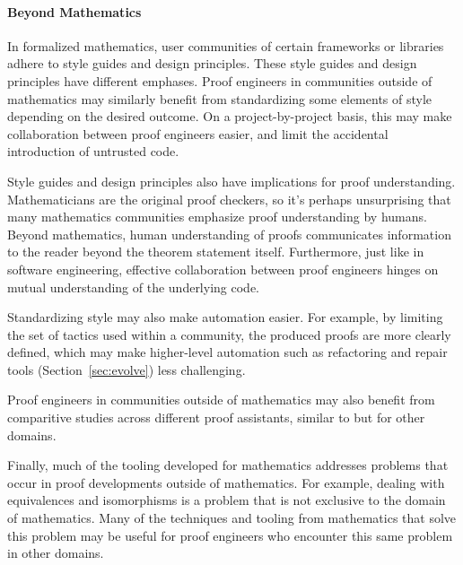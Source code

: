 \paragraph{Beyond Mathematics} In formalized
mathematics, user communities of certain frameworks or
libraries adhere to style guides and design principles. These style
guides and design principles have different emphases. 
Proof engineers in communities outside of mathematics may similarly benefit from standardizing
some elements of style depending on the desired outcome.  On a
project-by-project basis, this may make collaboration between proof
engineers easier, and limit the accidental introduction of untrusted
code.

Style guides and design principles also have implications for proof understanding. %
Mathematicians are the original proof checkers, so it's perhaps unsurprising that many
mathematics communities emphasize proof understanding by humans. 
Beyond mathematics, human understanding of
proofs communicates information to the reader beyond the theorem
statement itself. Furthermore, just like in software engineering,
effective collaboration between proof engineers hinges on mutual
understanding of the underlying code.

Standardizing style may also make automation easier. For example, by limiting
the set of tactics used within a community, the produced proofs are
more clearly defined, which may make higher-level automation such as
refactoring and repair tools (Section~\ref{sec:evolve}) less challenging.

Proof engineers in communities outside of mathematics may also benefit
from comparitive studies across different proof assistants, similar to
\cite{Wiedijk2006} but for other domains.

Finally, much of the tooling developed for mathematics addresses problems
that occur in proof developments outside of mathematics. 
For example, dealing with equivalences and isomorphisms is a problem that
is not exclusive to the domain of mathematics.
Many of the techniques and tooling from mathematics that solve
this problem may be useful for proof engineers who encounter this 
same problem in other domains.

